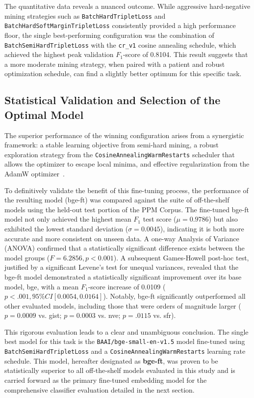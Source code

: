 The quantitative data reveals a nuanced outcome. While aggressive hard-negative mining strategies such as \verb|BatchHardTripletLoss| and \verb|BatchHardSoftMarginTripletLoss| consistently provided a high performance floor, the single best-performing configuration was the combination of \verb|BatchSemiHardTripletLoss| with the \verb|cr_v1| cosine annealing schedule, which achieved the highest peak validation \(F_1\)-score of 0.8104. This result suggests that a more moderate mining strategy, when paired with a patient and robust optimization schedule, can find a slightly better optimum for this specific task.

\subsection{Statistical Validation and Selection of the Optimal Model}\label{ch:4.4.3}
The superior performance of the winning configuration arises from a synergistic framework: a stable learning objective from semi-hard mining, a robust exploration strategy from the \verb|CosineAnnealingWarmRestarts| scheduler that allows the optimizer to escape local minima, and effective regularization from the AdamW optimizer~\cite{loshchilov2019decoupledweightdecayregularization,hermans2017defensetripletlossperson,Schroff_2015_CVPR,loshchilovhutter}.

To definitively validate the benefit of this fine-tuning process, the performance of the resulting model (bge-ft) was compared against the suite of off-the-shelf models using the held-out test portion of the PPM Corpus. The fine-tuned bge-ft model not only achieved the highest mean \(F_1\) test score (\(\mu = 0.9786\)) but also exhibited the lowest standard deviation (\(\sigma = 0.0045\)), indicating it is both more accurate and more consistent on unseen data. A one-way Analysis of Variance (ANOVA) confirmed that a statistically significant difference exists between the model groups (\(F=6.2856, p<0.001\)). A subsequent Games-Howell post-hoc test, justified by a significant Levene's test for unequal variances, revealed that the bge-ft model demonstrated a statistically significant improvement over its base model, bge, with a mean \(F_1\)-score increase of 0.0109 (\(p<.001, 95\% CI [0.0054, 0.0164]\)). Notably, bge-ft significantly outperformed all other evaluated models, including those that were orders of magnitude larger (\(p=0.0009\) vs. gist; \(p=0.0003\) vs. nve; \(p=.0115\) vs. sfr).

This rigorous evaluation leads to a clear and unambiguous conclusion. The single best model for this task is the \verb|BAAI/bge-small-en-v1.5| model fine-tuned using \verb|BatchSemiHardTripletLoss| and a \verb|CosineAnnealingWarmRestarts| learning rate schedule. This model, hereafter designated as \textbf{bge-ft}, was proven to be statistically superior to all off-the-shelf models evaluated in this study and is carried forward as the primary fine-tuned embedding model for the comprehensive classifier evaluation detailed in the next section.

